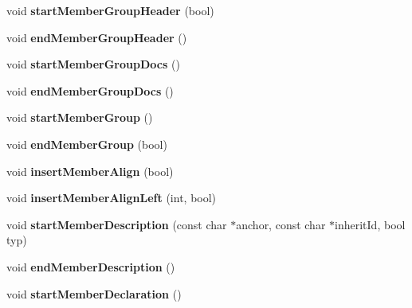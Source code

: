 \begin{DoxyCompactItemize}
\item 
\mbox{\label{class_html_generator_ad543e576da74cbcbe768b364d774f95c}} 
void {\bfseries start\+Member\+Group\+Header} (bool)
\item 
\mbox{\label{class_html_generator_ace78ed06d9ae28b81837172a3a5fc167}} 
void {\bfseries end\+Member\+Group\+Header} ()
\item 
\mbox{\label{class_html_generator_a70302c8014e5ddb69b5d90181de906d0}} 
void {\bfseries start\+Member\+Group\+Docs} ()
\item 
\mbox{\label{class_html_generator_a9881dc5213e18e6423d421326f833116}} 
void {\bfseries end\+Member\+Group\+Docs} ()
\item 
\mbox{\label{class_html_generator_aec0d118a7c03a3d6a4253110e35ed48e}} 
void {\bfseries start\+Member\+Group} ()
\item 
\mbox{\label{class_html_generator_a35213747d61865984f261d3fb7487e9d}} 
void {\bfseries end\+Member\+Group} (bool)
\item 
\mbox{\label{class_html_generator_a9342c375b88fae1c32c8aa9620142ee1}} 
void {\bfseries insert\+Member\+Align} (bool)
\item 
\mbox{\label{class_html_generator_a2162c8cab2978da211b0ec1662863f5d}} 
void {\bfseries insert\+Member\+Align\+Left} (int, bool)
\item 
\mbox{\label{class_html_generator_a7dadf4c726a67a11fd7e879a70a347a8}} 
void {\bfseries start\+Member\+Description} (const char $\ast$anchor, const char $\ast$inherit\+Id, bool typ)
\item 
\mbox{\label{class_html_generator_a8a2091bbac16931ce0f519f43658cf37}} 
void {\bfseries end\+Member\+Description} ()
\item 
\mbox{\label{class_html_generator_a16eb9767a8460f94d578bc9c0e62b581}} 
void {\bfseries start\+Member\+Declaration} ()

\end{DoxyCompactItemize}

